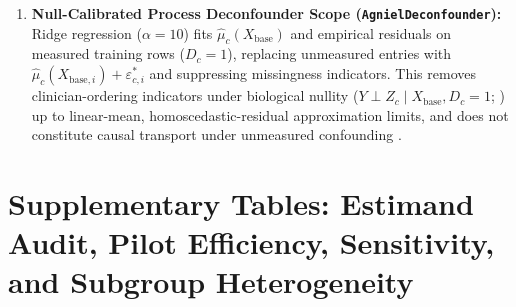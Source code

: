 \documentclass[11pt]{article}
\theoremstyle{remark}
\begin{document}
\begin{enumerate}
  \begin{equation}
    \frac{1}{K}\sum_{r=1}^{K} \sigma\!\big(\operatorname{logit}(p_{1,i}) + \mu_i^* + \delta_{c(i),r}\big) = p_{1,i}, \quad \widehat{\operatorname{VOI}}_i = \max\!\left\{0,\, L^*(p_{1,i}) - \frac{1}{K}\sum_{r=1}^{K} L^*(\tilde{p}_{2,i,r})\right\},
    \label{eq:emp_voi_app}
  \end{equation}
  with $\tilde{p}_{2,i,r} = \sigma(\operatorname{logit}(p_{1,i}) + \mu_i^* + \delta_{c(i),r})$. In Table~\ref{tab:prior_shift}, \citet{saerens2002adjusting} EM iterates $\pi^{(t+1)} = N_{\text{test}}^{-1}\sum_i \frac{(\pi^{(t)}/\pi_0)p_i}{(\pi^{(t)}/\pi_0)p_i + ((1-\pi^{(t)})/(1-\pi_0))(1-p_i)}$ solely on unlabeled test predictions $\{p_i\}$ without accessing $Y_{\text{test}}$.
  \item \textbf{Null-Calibrated Process Deconfounder Scope (\texttt{AgnielDeconfounder}):} Ridge regression ($\alpha=10$) fits $\hat{\mu}_c(X_{\text{base}})$ and empirical residuals on measured training rows ($D_c=1$), replacing unmeasured entries with $\hat{\mu}_c(X_{\text{base},i}) + \varepsilon_{c,i}^*$ and suppressing missingness indicators. This removes clinician-ordering indicators under biological nullity ($Y \perp Z_c \mid X_{\text{base}}, D_c=1$; \citealp{agniel2018biases}) up to linear-mean, homoscedastic-residual approximation limits, and does not constitute causal transport under unmeasured confounding \citep{vonkleist2025evaluation}.
\end{enumerate}

\section{Supplementary Tables: Estimand Audit, Pilot Efficiency, Sensitivity, and Subgroup Heterogeneity}
\label{app:supplement}
\end{document}
